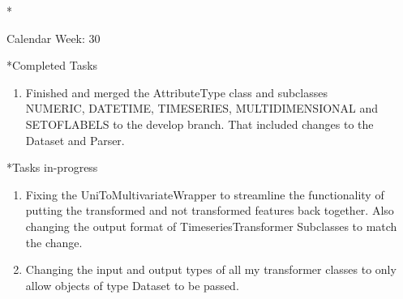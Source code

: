 \documentclass[11pt,a4paper]{article}
\begin{document}
\newpage
\begin{section}*{Calendar Week: 30 \hfill \date{30 July, 2021}}
	
	\begin{subsection}*{Completed Tasks}
		\begin{enumerate}
			\item Finished and merged the AttributeType class and subclasses \\NUMERIC, DATETIME, TIMESERIES, MULTIDIMENSIONAL and
			SETOFLABELS to the develop branch. That included changes to the Dataset and Parser.
		\end{enumerate}
	\end{subsection}
	
	\begin{subsection}*{Tasks in-progress}
		\begin{enumerate}
			\item Fixing the UniToMultivariateWrapper to streamline the functionality of putting the transformed and not transformed features back together. Also changing the output format of TimeseriesTransformer Subclasses to match the change.
			\item Changing the input and output types of all my transformer classes to only allow objects of type Dataset to be passed.
		\end{enumerate}
	\end{subsection}
	
\end{section}
\end{document}

